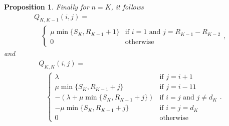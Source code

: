 \documentclass[conference]{IEEEtran}
\newtheorem{prosi}{Proposition}
\begin{document}
\begin{prosi}
% 

Finally for $n=K$, it follows
\begin{multline*}
Q_{K,K \!-\!1}(i,j) = \\
\quad 
\begin{cases}
\mu \min\{S_{K},R_{K \!-\!1} \!+\!1\}   & \! \mbox{if} \, \, i\!=\!1 \, \, \mbox{and} \, \,  j\!=\!R_{K \!-\!1}\!-\!R_{K\!-\!2}\\
0                                       & \! \mbox{otherwise}
\end{cases} ,
\end{multline*}
and 
\begin{multline*}
Q_{K,K}(i,j) = \\ 
\quad 
\begin{cases}
\lambda                                     & \mbox{if } j=i+1\\
\mu \min\{S_{K},R_{K\!-\!1}+j\}             & \mbox{if } j=i-11\\
-(\lambda+ \mu \min\{S_{K},R_{K-1}\!+\!j\}) & \mbox{if } i=j \mbox{ and } j \neq \! d_{K}\\
- \mu \min\{S_{K},R_{K-1}+j\}               & \mbox{if } i=j=\! d_{K}\\
0                                           & \mbox{otherwise} 
\end{cases}.
\end{multline*}
       

\end{prosi}
\end{document}
